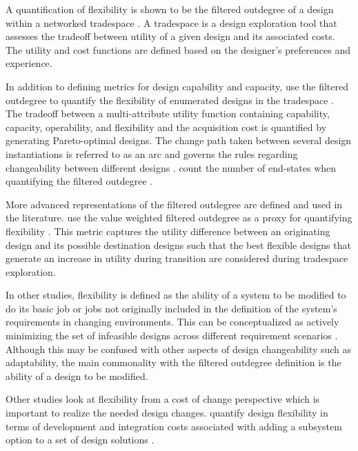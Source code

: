 A quantification of flexibility is shown to be the filtered outdegree of a design within a networked tradespace \cite{Ross2008}. A tradespace is a design exploration tool that assesses the tradeoff between utility of a given design and its associated costs. The utility and cost functions are defined based on the designer's preferences and experience.

In addition to defining metrics for design capability and capacity, \citeauthor{Rehn2018} use the filtered outdegree to quantify the flexibility of enumerated designs in the tradespace \cite{Rehn2018}. The tradeoff between a multi-attribute utility function containing capability, capacity, operability, and flexibility and the acquisition cost is quantified by generating Pareto-optimal designs. The change path taken between several design instantiations is referred to as an arc and governs the rules regarding changeability between different designs  \cite{Rehn2018, Viscito2009, Ross2008,Rapp2018}. \citeauthor{Rehn2018} count the number of end-states when quantifying the filtered outdegree \cite{Rehn2018}. %

More advanced representations of the filtered outdegree are defined and used in the literature. \citeauthor{Viscito2009} use the value weighted filtered outdegree as a proxy for quantifying flexibility \cite{Viscito2009}. This metric captures the utility difference between an originating design and its possible destination designs such that the best flexible designs that generate an increase in utility during transition are considered during tradespace exploration.

In other studies, flexibility is defined as the ability of a system to be modified to do its basic job or jobs not originally included in the definition of the system's requirements in changing environments. This can be conceptualized as actively minimizing the set of infeasible designs across different requirement scenarios \cite{Chalupnik2013}. Although this may be confused with other aspects of design changeability such as adaptability, the main commonality with the filtered outdegree definition is the ability of a design to be modified.

Other studies look at flexibility from a cost of change perspective which is important to realize the needed design changes. \citeauthor{Rapp2018} quantify design flexibility in terms of development and integration costs associated with adding a subsystem option to a set of design solutions \cite{Rapp2018}.

